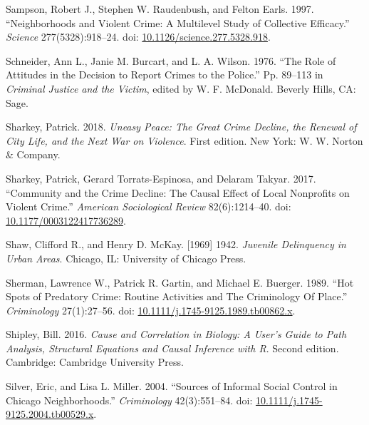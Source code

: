 \documentclass [11pt, proquest] {uwthesis}[2015/03/03]
\newlength{\cslhangindent}
\newenvironment{CSLReferences}[2]%
{\setlength{\parindent}{0pt}%
\everypar{\setlength{\hangindent}{\cslhangindent}}\ignorespaces}%
{\par}
\begin{document}
\begin{CSLReferences}{1}{0}
\leavevmode\hypertarget{ref-sampsonNeighborhoodsViolentCrime1997a}{}%
Sampson, Robert J., Stephen W. Raudenbush, and Felton Earls. 1997. {``Neighborhoods and {Violent Crime}: {A Multilevel Study} of {Collective Efficacy}.''} \emph{Science} 277(5328):918--24. doi: \href{https://doi.org/10.1126/science.277.5328.918}{10.1126/science.277.5328.918}.

\leavevmode\hypertarget{ref-schneiderRoleAttitudesDecision1976}{}%
Schneider, Ann L., Janie M. Burcart, and L. A. Wilson. 1976. {``The {Role} of {Attitudes} in the {Decision} to {Report Crimes} to the {Police}.''} Pp. 89--113 in \emph{Criminal {Justice} and the {Victim}}, edited by W. F. McDonald. {Beverly Hills, CA}: {Sage}.

\leavevmode\hypertarget{ref-sharkeyUneasyPeaceGreat2018}{}%
Sharkey, Patrick. 2018. \emph{Uneasy Peace: The Great Crime Decline, the Renewal of City Life, and the Next War on Violence}. First edition. {New York}: {W. W. Norton \& Company}.

\leavevmode\hypertarget{ref-sharkeyCommunityCrimeDecline2017}{}%
Sharkey, Patrick, Gerard Torrats-Espinosa, and Delaram Takyar. 2017. {``Community and the {Crime Decline}: {The Causal Effect} of {Local Nonprofits} on {Violent Crime}.''} \emph{American Sociological Review} 82(6):1214--40. doi: \href{https://doi.org/10.1177/0003122417736289}{10.1177/0003122417736289}.

\leavevmode\hypertarget{ref-shawJuvenileDelinquencyUrban1942}{}%
Shaw, Clifford R., and Henry D. McKay. {[}1969{]} 1942. \emph{Juvenile {Delinquency} in {Urban Areas}}. {Chicago, IL}: {University of Chicago Press}.

\leavevmode\hypertarget{ref-shermanHotSpotsPredatory1989}{}%
Sherman, Lawrence W., Patrick R. Gartin, and Michael E. Buerger. 1989. {``Hot {Spots} of {Predatory Crime}: {Routine Activities} and {The Criminology Of Place}.''} \emph{Criminology} 27(1):27--56. doi: \href{https://doi.org/10.1111/j.1745-9125.1989.tb00862.x}{10.1111/j.1745-9125.1989.tb00862.x}.

\leavevmode\hypertarget{ref-shipleyCauseCorrelationBiology2016}{}%
Shipley, Bill. 2016. \emph{Cause and Correlation in Biology: A User's Guide to Path Analysis, Structural Equations and Causal Inference with {R}}. Second edition. {Cambridge}: {Cambridge University Press}.

\leavevmode\hypertarget{ref-silverSourcesInformalSocial2004}{}%
Silver, Eric, and Lisa L. Miller. 2004. {``Sources of {Informal Social Control} in {Chicago Neighborhoods}.''} \emph{Criminology} 42(3):551--84. doi: \href{https://doi.org/10.1111/j.1745-9125.2004.tb00529.x}{10.1111/j.1745-9125.2004.tb00529.x}.


\end{CSLReferences}
\end{document}
